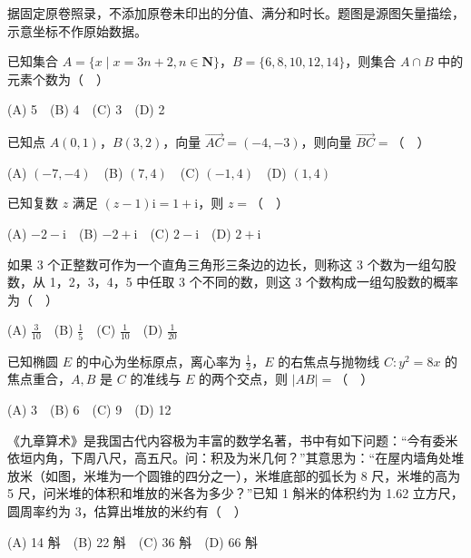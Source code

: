 

\begin{gktip}
据固定原卷照录，不添加原卷未印出的分值、满分和时长。题图是源图矢量描绘，示意坐标不作原始数据。
\end{gktip}


\begin{question}
已知集合 $A=\{x\mid x=3n+2,n\in\mathbf N\}$，$B=\{6,8,10,12,14\}$，则集合 $A\cap B$ 中的元素个数为（　）

(A) 5　(B) 4　(C) 3　(D) 2

\end{question}
\begin{question}
已知点 $A(0,1)$，$B(3,2)$，向量 $\overrightarrow{AC}=(-4,-3)$，则向量 $\overrightarrow{BC}=$（　）

(A) $(-7,-4)$　(B) $(7,4)$　(C) $(-1,4)$　(D) $(1,4)$

\end{question}
\begin{question}
已知复数 $z$ 满足 $(z-1)\mathrm i=1+\mathrm i$，则 $z=$（　）

(A) $-2-\mathrm i$　(B) $-2+\mathrm i$　(C) $2-\mathrm i$　(D) $2+\mathrm i$

\end{question}
\begin{question}
如果 3 个正整数可作为一个直角三角形三条边的边长，则称这 3 个数为一组勾股数，从 1，2，3，4，5 中任取 3 个不同的数，则这 3 个数构成一组勾股数的概率为（　）

(A) $\frac3{10}$　(B) $\frac15$　(C) $\frac1{10}$　(D) $\frac1{20}$

\end{question}
\begin{question}
已知椭圆 $E$ 的中心为坐标原点，离心率为 $\frac12$，$E$ 的右焦点与抛物线 $C:y^2=8x$ 的焦点重合，$A,B$ 是 $C$ 的准线与 $E$ 的两个交点，则 $|AB|=$（　）

(A) 3　(B) 6　(C) 9　(D) 12

\Needspace{0.4\textheight}
\end{question}
\begin{question}
《九章算术》是我国古代内容极为丰富的数学名著，书中有如下问题：“今有委米依垣内角，下周八尺，高五尺。问：积及为米几何？”其意思为：“在屋内墙角处堆放米（如图，米堆为一个圆锥的四分之一），米堆底部的弧长为 8 尺，米堆的高为 5 尺，问米堆的体积和堆放的米各为多少？”已知 1 斛米的体积约为 1.62 立方尺，圆周率约为 3，估算出堆放的米约有（　）
\nopagebreak[4]
\begin{center}\end{center}
\nopagebreak[4]
(A) 14 斛　(B) 22 斛　(C) 36 斛　(D) 66 斛

\end{question}
